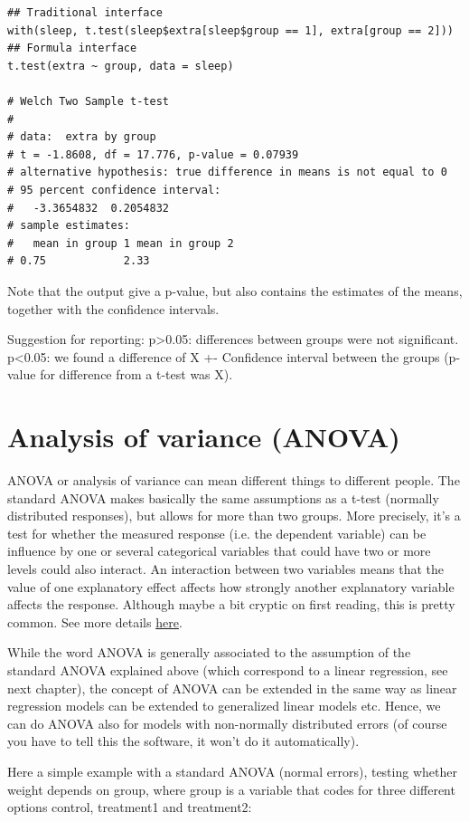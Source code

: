 \documentclass[a4paper,twoside]{tufte-book} %
\begin{document}
\begin{lstlisting}
## Traditional interface
with(sleep, t.test(sleep$extra[sleep$group == 1], extra[group == 2]))
## Formula interface
t.test(extra ~ group, data = sleep)

# Welch Two Sample t-test
# 
# data:  extra by group
# t = -1.8608, df = 17.776, p-value = 0.07939
# alternative hypothesis: true difference in means is not equal to 0
# 95 percent confidence interval:
#   -3.3654832  0.2054832
# sample estimates:
#   mean in group 1 mean in group 2 
# 0.75            2.33 
\end{lstlisting}

Note that the output give a p-value, but also contains the estimates of the means, together with the confidence intervals. 

Suggestion for reporting: p>0.05: differences between groups were not significant. p<0.05: we found a difference of X +- Confidence interval between the groups (p-value for difference from a t-test was X). 

\section{Analysis of variance (ANOVA)}

ANOVA or analysis of variance can mean different things to different people. The standard ANOVA makes basically the same assumptions as a t-test (normally distributed responses), but allows for more than two groups. More precisely, it's a test for whether the measured response (i.e. the dependent variable) can be influence by one or several categorical variables that could have two or more levels could also interact. An interaction between two variables means that the value of one explanatory effect affects how strongly another explanatory variable affects the response. Although maybe a bit cryptic on first reading, this is pretty common. See more details \href{biometry.github.io/APES/concepts/interaction.html}{here}.

While the word ANOVA is generally associated to the assumption of the standard ANOVA explained above (which correspond to a linear regression, see next chapter), the concept of ANOVA can be extended in the same way as linear regression models can be extended to generalized linear models etc. Hence, we can do ANOVA also for models with non-normally distributed errors (of course you have to tell this the software, it won't do it automatically). 

Here a simple example with a standard ANOVA (normal errors), testing whether weight depends on group, where group is a variable that codes for three different options control, treatment1 and treatment2:
\end{document}
